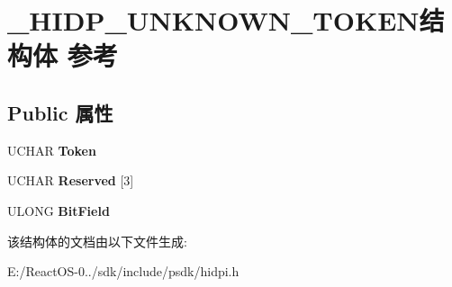 \hypertarget{struct___h_i_d_p___u_n_k_n_o_w_n___t_o_k_e_n}{}\section{\+\_\+\+H\+I\+D\+P\+\_\+\+U\+N\+K\+N\+O\+W\+N\+\_\+\+T\+O\+K\+E\+N结构体 参考}
\label{struct___h_i_d_p___u_n_k_n_o_w_n___t_o_k_e_n}
\subsection*{Public 属性}
\begin{DoxyCompactItemize}
\item 
\mbox{\label{struct___h_i_d_p___u_n_k_n_o_w_n___t_o_k_e_n_a7ad61e8bebac8834ff6ae945d3819821}} 
U\+C\+H\+AR {\bfseries Token}
\item 
\mbox{\label{struct___h_i_d_p___u_n_k_n_o_w_n___t_o_k_e_n_a8b060c702bea00d0f87bfd30bdc4344b}} 
U\+C\+H\+AR {\bfseries Reserved} \mbox{[}3\mbox{]}
\item 
\mbox{\label{struct___h_i_d_p___u_n_k_n_o_w_n___t_o_k_e_n_acd55c4633797ca11b268432b4a46ca96}} 
U\+L\+O\+NG {\bfseries Bit\+Field}
\end{DoxyCompactItemize}


该结构体的文档由以下文件生成\+:\begin{DoxyCompactItemize}
\item 
E\+:/\+React\+O\+S-\/0../sdk/include/psdk/hidpi.\+h\end{DoxyCompactItemize}
